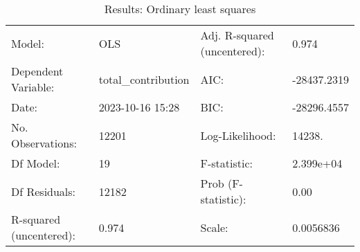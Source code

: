 \begin{table}
\caption{Results: Ordinary least squares}
\label{}
\begin{center}
\begin{tabular}{llll}
\hline
Model:                  & OLS                 & Adj. R-squared (uncentered): & 0.974        \\
Dependent Variable:     & total\_contribution & AIC:                         & -28437.2319  \\
Date:                   & 2023-10-16 15:28    & BIC:                         & -28296.4557  \\
No. Observations:       & 12201               & Log-Likelihood:              & 14238.       \\
Df Model:               & 19                  & F-statistic:                 & 2.399e+04    \\
Df Residuals:           & 12182               & Prob (F-statistic):          & 0.00         \\
R-squared (uncentered): & 0.974               & Scale:                       & 0.0056836    \\
\hline
\end{tabular}
\end{center}


\end{table}
